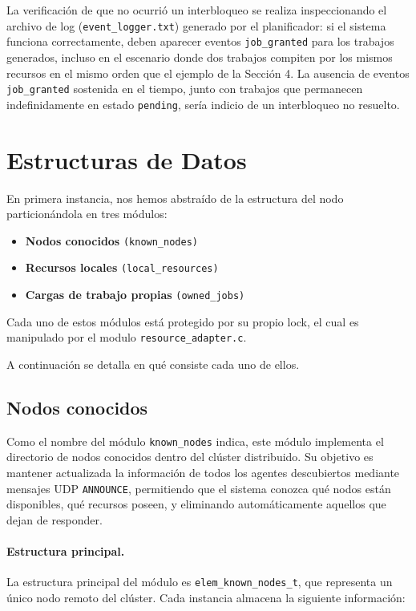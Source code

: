 \documentclass[12pt,a4paper]{article}
\begin{document}
La verificación de que no ocurrió un interbloqueo se realiza inspeccionando el archivo de log (\texttt{event\_logger.txt}) generado por el planificador: si el sistema funciona correctamente, deben aparecer eventos \texttt{job\_granted} para los trabajos generados, incluso en el escenario donde dos trabajos compiten por los mismos recursos en el mismo orden que el ejemplo de la Sección 4. La ausencia de eventos \texttt{job\_granted} sostenida en el tiempo, junto con trabajos que permanecen indefinidamente en estado \texttt{pending}, sería indicio de un interbloqueo no resuelto.

\section{Estructuras de Datos}
\label{sec:estructuras}

En primera instancia, nos hemos abstraído de la estructura del nodo particionándola en tres módulos:
 
\begin{itemize}
    \item \textbf{Nodos conocidos} \texttt{(known\_nodes)}
    \item \textbf{Recursos locales} \texttt{(local\_resources)}
    \item \textbf{Cargas de trabajo propias} \texttt{(owned\_jobs)}
\end{itemize}
 
Cada uno de estos módulos está protegido por su propio lock, el cual es manipulado por el modulo \texttt{resource\_adapter.c}. 

A continuación se detalla en qué consiste cada uno de ellos.

\subsection{Nodos conocidos}
 
Como el nombre del módulo \texttt{known\_nodes} indica, este módulo implementa el directorio de nodos conocidos dentro del clúster distribuido. Su objetivo es mantener actualizada la información de todos los agentes descubiertos mediante mensajes UDP \texttt{ANNOUNCE}, permitiendo que el sistema conozca qué nodos están disponibles, qué recursos poseen, y eliminando automáticamente aquellos que dejan de responder.
 
\paragraph{Estructura principal.}
La estructura principal del módulo es \texttt{elem\_known\_nodes\_t}, que representa un único nodo remoto del clúster. Cada instancia almacena la siguiente información:
 
\end{document}
